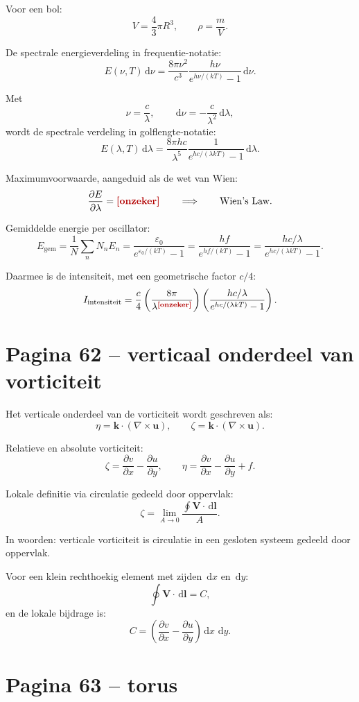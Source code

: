 \documentclass[11pt,a4paper]{article}
\newcommand{\onzeker}[1]{\ifmmode\text{\color{red!70!black}\bfseries[onzeker]}\else\textcolor{red!70!black}{\textbf{[onzeker:} #1\textbf{]}}\fi}
\newcommand{\vect}[1]{\mathbf{#1}}
\newcommand{\dd}{\,\mathrm{d}}
\begin{document}
Voor een bol:
$$
V=\frac{4}{3}\pi R^{3},
\qquad
\rho=\frac{m}{V}.
$$

De spectrale energieverdeling in frequentie-notatie:
$$
E(\nu,T)\dd\nu
=
\frac{8\pi \nu^{2}}{c^{3}}
\frac{h\nu}{e^{h\nu/(kT)}-1}
\dd\nu .
$$

Met
$$
\nu=\frac{c}{\lambda},
\qquad
\dd\nu=-\frac{c}{\lambda^{2}}\dd\lambda,
$$
wordt de spectrale verdeling in golflengte-notatie:
$$
E(\lambda,T)\dd\lambda
=
\frac{8\pi hc}{\lambda^{5}}
\frac{1}{e^{hc/(\lambda kT)}-1}
\dd\lambda .
$$

Maximumvoorwaarde, aangeduid als de wet van Wien:
$$
\frac{\partial E}{\partial \lambda}
=
\onzeker{8\pi hc\cdots}
\qquad
\Longrightarrow
\qquad
\text{Wien's Law}.
$$

Gemiddelde energie per oscillator:
$$
E_{\mathrm{gem}}
=
\frac{1}{N}\sum_n N_nE_n
=
\frac{\varepsilon_0}{e^{\varepsilon_0/(kT)}-1}
=
\frac{hf}{e^{hf/(kT)}-1}
=
\frac{hc/\lambda}{e^{hc/(\lambda kT)}-1}.
$$

Daarmee is de intensiteit, met een geometrische factor $c/4$:
$$
I_{\mathrm{intensiteit}}
=
\frac{c}{4}
\left(
\frac{8\pi}{\lambda^{\onzeker{4}}}
\right)
\left(
\frac{hc/\lambda}{e^{hc/(\lambda kT)}-1}
\right).
$$

\section*{Pagina 62 -- verticaal onderdeel van vorticiteit}

Het verticale onderdeel van de vorticiteit wordt geschreven als:
$$
\eta=\vect{k}\cdot(\nabla\times\vect{u}),
\qquad
\zeta=\vect{k}\cdot(\nabla\times\vect{u}).
$$

Relatieve en absolute vorticiteit:
$$
\zeta=\frac{\partial v}{\partial x}-\frac{\partial u}{\partial y},
\qquad
\eta=\frac{\partial v}{\partial x}-\frac{\partial u}{\partial y}+f.
$$

Lokale definitie via circulatie gedeeld door oppervlak:
$$
\zeta
=
\lim_{A\to 0}
\frac{\displaystyle\oint \vect{V}\cdot\dd\vect{l}}{A}.
$$

In woorden: verticale vorticiteit is circulatie in een gesloten systeem gedeeld door oppervlak.

Voor een klein rechthoekig element met zijden $\dd x$ en $\dd y$:
$$
\oint \vect{V}\cdot\dd\vect{l}=C,
$$
en de lokale bijdrage is:
$$
C
=
\left(
\frac{\partial v}{\partial x}
-
\frac{\partial u}{\partial y}
\right)
\dd x\,\dd y.
$$

\section*{Pagina 63 -- torus}
\end{document}
